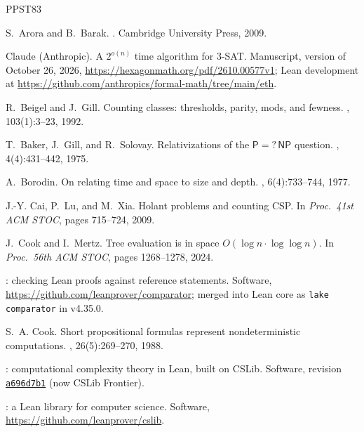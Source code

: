 \documentclass[11pt]{article}
\theoremstyle{definition}
\theoremstyle{definition}
\theoremstyle{remark}
\begin{document}
\begin{thebibliography}{PPST83}\small\setlength{\itemsep}{1.5pt}

S.~Arora and B.~Barak.
.
\newblock Cambridge University Press, 2009.

Claude (Anthropic).
\newblock A $2^{o(n)}$ time algorithm for 3-SAT.
\newblock Manuscript, version of October 26, 2026, \url{https://hexagonmath.org/pdf/2610.00577v1}; Lean development at \url{https://github.com/anthropics/formal-math/tree/main/eth}.

R.~Beigel and J.~Gill.
\newblock Counting classes: thresholds, parity, mods, and fewness.
, 103(1):3--23, 1992.

T.~Baker, J.~Gill, and R.~Solovay.
\newblock Relativizations of the $\mathsf P=?\,\mathsf{NP}$ question.
, 4(4):431--442, 1975.

A.~Borodin.
\newblock On relating time and space to size and depth.
, 6(4):733--744, 1977.

J.-Y. Cai, P.~Lu, and M.~Xia.
\newblock Holant problems and counting {CSP}.
\newblock In {\em Proc.\ 41st ACM STOC}, pages 715--724, 2009.

J.~Cook and I.~Mertz.
\newblock Tree evaluation is in space ${O}(\log n\cdot\log\log n)$.
\newblock In {\em Proc.\ 56th ACM STOC}, pages 1268--1278, 2024.

: checking {L}ean proofs against reference statements.
\newblock Software, \url{https://github.com/leanprover/comparator}; merged into Lean core as \texttt{lake comparator} in v4.35.0.

S.~A. Cook.
\newblock Short propositional formulas represent nondeterministic computations.
, 26(5):269--270, 1988.

: computational complexity theory in {L}ean, built on {CSLib}.
\newblock Software, revision \href{https://github.com/cslib-community/cslib-frontier/tree/a696d7b149f95e241251ed0f575645d6468a9ccc}{\texttt{a696d7b1}} (now CSLib Frontier).

: a {L}ean library for computer science.
\newblock Software, \url{https://github.com/leanprover/cslib}.


\end{thebibliography}
\end{document}
